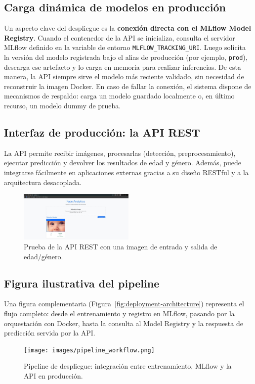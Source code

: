 \subsection{Carga dinámica de modelos en producción}
Un aspecto clave del despliegue es la \textbf{conexión directa con el MLflow Model Registry}. 
Cuando el contenedor de la API se inicializa, consulta el servidor MLflow definido en la variable de entorno \texttt{MLFLOW\_TRACKING\_URI}. 
Luego solicita la versión del modelo registrada bajo el alias de producción (por ejemplo, \texttt{prod}), descarga ese artefacto y lo carga en memoria para realizar inferencias. 
De esta manera, la API siempre sirve el modelo más reciente validado, sin necesidad de reconstruir la imagen Docker. 
En caso de fallar la conexión, el sistema dispone de mecanismos de respaldo: carga un modelo guardado localmente o, en último recurso, un modelo dummy de prueba.

\subsection{Interfaz de producción: la API REST}
La API permite recibir imágenes, procesarlas (detección, preprocesamiento), ejecutar predicción y devolver los resultados de edad y género. 
Además, puede integrarse fácilmente en aplicaciones externas gracias a su diseño RESTful y a la arquitectura desacoplada.

\begin{figure}[h]
\includegraphics[width=0.5\textwidth]{images/frontend_project.jpeg}
\centering
\caption{Prueba de la API REST con una imagen de entrada y salida de edad/género.}
\label{fig:api-frontend}
\end{figure}

\subsection{Figura ilustrativa del pipeline}
Una figura complementaria (Figura~\ref{fig:deployment-architecture}) representa el flujo completo: 
desde el entrenamiento y registro en MLflow, pasando por la orquestación con Docker, hasta la consulta al Model Registry y la respuesta de predicción servida por la API.

\begin{figure}[h]
\centering
\texttt{[image: images/pipeline\_workflow.png]}
\caption{Pipeline de despliegue: integración entre entrenamiento, MLflow y la API en producción.}
\label{fig:pipeline_workflow}
\end{figure}
